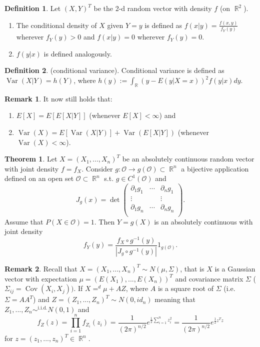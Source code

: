 \documentclass[11pt]{article}
\theoremstyle{definition}
\DeclareMathOperator{\iid}{i.i.d.}
\DeclareMathOperator{\var}{Var}
\DeclareMathOperator{\cov}{Cov}
\DeclareMathOperator{\R}{\mathbb{R}}
\newtheorem{thm}{Theorem}
\newtheorem{defn}{Definition}
\newtheorem{rem}{Remark}
\begin{document}
\begin{defn}
Let $(X,Y)^T$ be the 2-d random vector with density $f$ (on $\R^2$).
\begin{enumerate}
\item The conditional density of $X$ given $Y=y$ is defined as
$f(x|y)=\frac{f(x,y)}{f_Y(y)}$ wherever $f_Y(y)>0$ and $f(x|y)=0$ wherever $f_Y(y)=0$.
\item $f(y|x)$ is defined analogously.
\end{enumerate}
\end{defn}

\begin{defn}(conditional variance). Conditional variance is defined as $\var (X|Y)=h(Y)$, where $h(y):=\int_{\R}(y-E(y|X=x))^2 f(y|x)dy$.
\end{defn}

\begin{rem}
It now still holds that:
\begin{enumerate}
\item $E[X]=E[E[X|Y]]$ (whenever $E[X]<\infty$) and
\item $\var (X)=E[\var(X|Y)]+ \var (E[X|Y])$ (whenever $\var (X)<\infty$).
\end{enumerate}
\end{rem}

\begin{thm} Let $X=(X_1,...,X_n)^T$ be an absolutely continuous random vector with joint density $f=f_X$. Consider $g:\mathcal{O}\rightarrow g(\mathcal{O})\subset \R^n$ a bijective application defined on an open set $\mathcal{O}\subset\R^n$ s.t. $g\in C^1(\mathcal{O})$ and
\[J_g(x)=\det\begin{pmatrix}
\partial_1 g_1  &  \cdots  &  \partial_n g_1\\
\vdots        &\         &  \vdots\\
\partial_1 g_n  &\cdots    &  \partial_n g_n\\
\end{pmatrix}.\]
Assume that $P(X\in\mathcal{O})=1$. Then $Y=g(X)$ is an absolutely continuous with joint density
\[f_Y(y)=\frac{f_X\circ g^{-1}(y)}{|J_g\circ g^{-1}(y)|}1_{g(\mathcal{O})}.\]
\end{thm}

\begin{rem} Recall that $X=(X_1,...,X_n)^T\sim N(\mu,\Sigma)$, that is $X$ is a Gaussian vector with expectation $\mu =(E(X_1),...,E(X_n))^T$ and covariance matrix $\Sigma$ ($\Sigma_{ij}=\cov(X_i,X_j))$. If $X=^d\mu+AZ$, where $A$ is a square root of $\Sigma$ (i.e. $\Sigma=AA^T$) and $Z=(Z_1,...,Z_n)^T\sim N(0,id_n)$ meaning that $Z_1,...,Z_n\sim^{\iid} N(0,1)$ and
\[f_Z(z)=\prod^n_{i=1} f_{Z_i}(z_i)=\frac{1}{(2\pi)^{n/2}}e^{\frac{1}{2}\sum^n_{i=1}z_i^2}=\frac{1}{(2\pi)^{n/2}}e^{\frac{1}{2}z^T z}\]
for $z=(z_1,...,z_n)^T\in\R^n.$
\end{rem}
\end{document}
